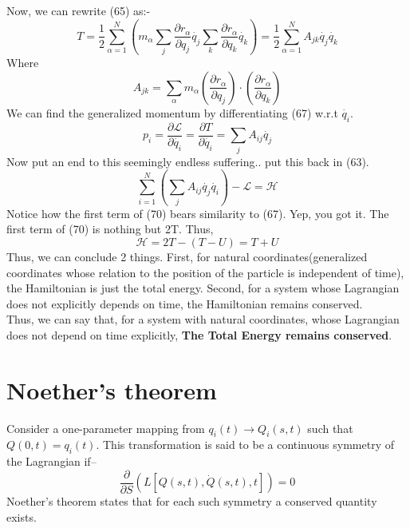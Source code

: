 \documentclass[12pt]{article}
\begin{document}
    Now, we can rewrite (65) as:-
    \begin{equation}
        T = \frac{1}{2}\sum_{\alpha=1}^{N}\left(m_{\alpha}\sum_{j}\frac{\partial r_{\alpha}}{\partial q_j}\dot{q_j}\sum_{k}\frac{\partial r_{\alpha}}{\partial q_k}\dot{q_k}\right)=\frac{1}{2}\sum_{\alpha=1}^{N}A_{jk}\dot{q_j}\dot{q_k}
    \end{equation}
    Where 
    \begin{equation}
        A_{jk}=\sum_{\alpha}m_{\alpha}\left(\frac{\partial r_{\alpha}}{\partial q_j}\right)\cdot\left(\frac{\partial r_{\alpha}}{\partial q_k}\right)
    \end{equation}
    We can find the generalized momentum by differentiating (67) w.r.t $\dot{q_i}$.
    \begin{equation}
        p_i = \frac{\partial \mathcal{L}}{\partial \dot{q_i}}=\frac{\partial T}{\partial \dot{q_i}}=\sum_{j}A_{ij}\dot{q_j}
    \end{equation}
    Now put an end to this seemingly endless suffering.. put this back in (63).
    \begin{equation}
        \sum_{i=1}^{N}\left(\sum_{j}A_{ij}\dot{q_j}\dot{q_i}\right)-\mathcal{L}=\mathcal{H}
    \end{equation}
    Notice how the first term of (70) bears similarity to (67). Yep, you got it. The first term of (70) is nothing but 2T. Thus,
    \begin{equation}
        \mathcal{H}=2T-(T-U)=T+U
    \end{equation}
    Thus, we can conclude 2 things. First, for natural coordinates(generalized coordinates whose relation to the position of the particle is independent of time), the Hamiltonian is just the total energy.
    Second, for a system whose Lagrangian does not explicitly depends on time, the Hamiltonian remains conserved.
    \\ Thus, we can say that, for a system with natural coordinates, whose Lagrangian does not depend on time explicitly, \textbf{The Total Energy remains conserved}.

    \section{Noether's theorem}
    Consider a one-parameter mapping from $q_i(t)\rightarrow Q_i(s,t)$ such that $Q(0,t)=q_i(t)$. This transformation 
    is said to be a continuous symmetry of the Lagrangian if--
    \begin{equation}
        \frac{\partial}{\partial S}\left(L[Q(s,t),\dot{Q}(s,t),t]\right)=0
    \end{equation}
    Noether's theorem states that for each such symmetry a conserved quantity exists. 
\end{document}
